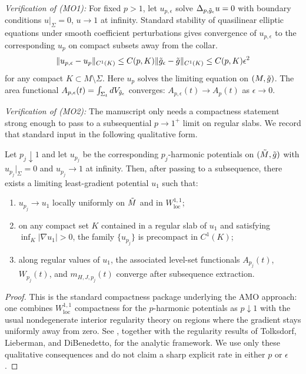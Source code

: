 \begin{remark}
\textit{Verification of (MO1):} For fixed $p > 1$, let $u_{p,\epsilon}$ solve $\Delta_{p,\tilde{g}_\epsilon} u = 0$ with boundary conditions $u|_\Sigma = 0$, $u \to 1$ at infinity. Standard stability of quasilinear elliptic equations under smooth coefficient perturbations gives convergence of $u_{p,\epsilon}$ to the corresponding $u_p$ on compact subsets away from the collar.
\[
\|u_{p,\epsilon} - u_p\|_{C^1(K)} \leq C(p, K) \|\tilde{g}_\epsilon - \tilde{g}\|_{C^1(K)} \leq C(p, K) \epsilon^2
\]
for any compact $K \subset M \setminus \Sigma$. Here $u_p$ solves the limiting equation on $(M, \tilde{g})$. The area functional $A_{p,\epsilon}(t) = \int_{\Sigma_t} dV_{\tilde{g}_\epsilon}$ converges: $A_{p,\epsilon}(t) \to A_p(t)$ as $\epsilon \to 0$.

\textit{Verification of (MO2):} The manuscript only needs a compactness statement strong enough to pass to a subsequential $p \to 1^+$ limit on regular slabs. We record that standard input in the following qualitative form.

\begin{lemma}\label{lem:uniform-p-estimates}
Let $p_j \downarrow 1$ and let $u_{p_j}$ be the corresponding $p_j$-harmonic potentials on $(\tilde{M},\tilde{g})$ with $u_{p_j}|_\Sigma=0$ and $u_{p_j}\to 1$ at infinity. Then, after passing to a subsequence, there exists a limiting least-gradient potential $u_1$ such that:
\begin{enumerate}
    \item[(i)] $u_{p_j} \to u_1$ locally uniformly on $\tilde{M}$ and in $W^{1,1}_{\mathrm{loc}}$;
    \item[(ii)] on any compact set $K$ contained in a regular slab of $u_1$ and satisfying $\inf_K |\nabla u_1|>0$, the family $\{u_{p_j}\}$ is precompact in $C^1(K)$;
    \item[(iii)] along regular values of $u_1$, the associated level-set functionals $A_{p_j}(t)$, $W_{p_j}(t)$, and $m_{H,J,p_j}(t)$ converge after subsequence extraction.
\end{enumerate}
\end{lemma}

\begin{proof}
This is the standard compactness package underlying the AMO approach: one combines $W^{1,1}_{\mathrm{loc}}$ compactness for the $p$-harmonic potentials as $p \downarrow 1$ with the usual nondegenerate interior regularity theory on regions where the gradient stays uniformly away from zero. See \cite{amo2022}, together with the regularity results of Tolksdorf, Lieberman, and DiBenedetto, for the analytic framework. We use only these qualitative consequences and do not claim a sharp explicit rate in either $p$ or $\epsilon$.
\end{proof}


\end{remark}
